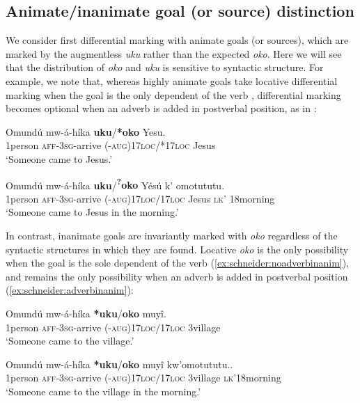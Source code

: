 \documentclass[output=paper]{langscibook}
\begin{document}
\subsection{Animate/inanimate goal (or source) distinction}\label{sec:schneider:subsection4.1}

We consider first differential marking with animate goals (or sources), which are marked by the augmentless \textit{uku} rather than the expected \textit{oko}. Here we will see that the distribution of \textit{oko} and \textit{uku} is sensitive to syntactic structure. For example, we note that, whereas highly animate goals take locative differential marking when the goal is the only dependent of the verb , differential marking becomes optional when an adverb is added in postverbal position, as in : 

\ea \label{ex:schneider:exampleswithadverbs}
\begin{xlist}

\ex \label{ex:schneider:noadverb}
\gll Omundú mw-á-híka    \textbf{uku}/\textbf{*oko} Yesu. \\
1person  \textsc{aff-3sg-}arrive (-\textsc{aug})17\textsc{loc}/*17\textsc{loc} Jesus \\
\glt `Someone came to Jesus.' 

\ex \label{ex:schneider:adverb}
\gll Omundú mw-á-híka    \textbf{uku}/\textbf{\textsuperscript{?}oko} Y\'esú k' omotututu. \\
1person  \textsc{aff-3sg-}arrive (-\textsc{aug})17\textsc{loc}/17\textsc{loc} Jesus \textsc{lk'} 18morning\\
\glt `Someone came to Jesus in the morning.' 

\end{xlist}

\z

In contrast, inanimate goals are invariantly marked with \textit{oko} regardless of the syntactic structures in which they are found. Locative \textit{oko} is the only possibility when the goal is the sole dependent of the verb (\ref{ex:schneider:noadverbinanim}), and remains the only possibility when an adverb is added in postverbal position (\ref{ex:schneider:adverbinanim}):


\ea \label{ex:schneider:exampleswithadverbsAnim}
\begin{xlist}

\ex \label{ex:schneider:noadverbinanim}
\gll Omundú mw-á-híka    \textbf{*uku}/\textbf{\Checkmark oko} muyî. \\
1person  \textsc{aff-3sg-}arrive (-\textsc{aug})17\textsc{loc}/17\textsc{loc}  3village \\
\glt `Someone came to the village.' 

\ex \label{ex:schneider:adverbinanim}
\gll Omundú mw-á-híka    \textbf{*uku}/\textbf{\Checkmark oko} muyî kw’omotututu.. \\
1person  \textsc{aff-3sg-}arrive (-\textsc{aug})17\textsc{loc}/17\textsc{loc} 3village \textsc{lk}'18morning \\
\glt `Someone came to the village in the morning.' 

\end{xlist}
\end{document}
